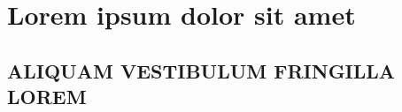 \chapter{Lorem ipsum dolor sit amet}

\lipsum[1]

\section{\uppercase{Aliquam vestibulum fringilla lorem}}

\lipsum[1]

\lipsum[2-3]